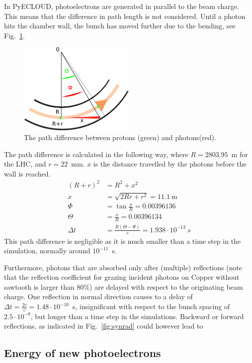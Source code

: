 In PyECLOUD, photoelectrons are generated in parallel to the beam charge.
This means that the difference in path length is not considered.
Until a photon hits the chamber wall, the bunch has moved further due to the bending, see Fig.~\ref{fig:drawing}.
\begin{figure}[tbh]
    \centering
    \includegraphics[width=0.5\textwidth]{../scripts/drawing.pdf}
    \caption{The path difference between protons (green) and photons(red).}
    \label{fig:drawing}
\end{figure}
The path difference is calculated in the following way, where $R=2803.95$~m for the LHC, and $r=22$~mm.
$x$ is the distance travelled by the photons before the wall is reached.
\begin{align}
    (R+r)^2 &= R^2 + x^2
    \\
    x &= \sqrt{2Rr + r^2} = 11.1~\text{m}
    \\
    \Phi &= \tan\frac{x}{R} = 0.00396136
    \\
    \Theta &= \frac{x}{R} = 0.00396134
    \\
    \Delta t &= \frac{R(\Theta - \Psi)}{c} = 1.938\cdot10^{-13}~s
\end{align}
This path difference is negligible as it is much smaller than a time step in the simulation, normally around $10^{-11}$~s.

Furthermore, photons that are absorbed only after (multiple) reflections (note that the reflection coefficient for grazing incident photons on Copper without sawtooth is larger than 80\%) are delayed with respect to the originating beam charge.
One reflection in normal direction causes to a delay of $\Delta t = \frac{2r}{c} = 1.48\cdot10^{-10}$~s, insignificant with respect to the bunch spacing of $2.5\cdot10^{-8}$, but longer than a time step in the simulations.
Backward or forward reflections, as indicated in Fig.~\ref{fig:synrad} could however lead to 


\subsection{Energy of new photoelectrons}

